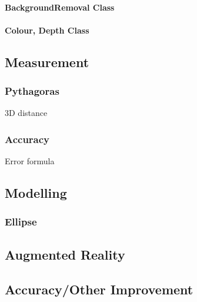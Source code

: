 \paragraph{BackgroundRemoval Class}

\paragraph{Colour, Depth Class}


\subsection{Measurement}

\subsubsection{Pythagoras}
3D distance \cite{nonContact2017}\\

\subsubsection{Accuracy}
Error formula \cite{nonContact2017}\\

\subsection{Modelling}

\subsubsection{Ellipse}


\subsection{Augmented Reality}


\subsection{Accuracy/Other Improvement }